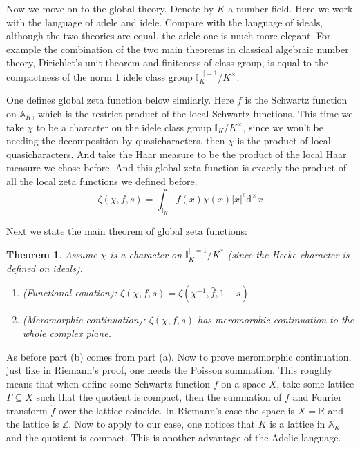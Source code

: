 \documentclass[10pt]{article}
\theoremstyle{plain}
\newtheorem{thm}{Theorem}
\theoremstyle{remark}
\begin{document}
	Now we move on to the global theory. Denote by $K$ a number field. Here we work with the language of adele and idele. Compare with the language of ideals, although the two theories are equal, the adele one is much more elegant. For example the combination of the two main theorems in classical algebraic number theory, Dirichlet's unit theorem and finiteness of class group, is equal to the compactness of the norm 1 idele class group $\mathbb{I}_K^{|\cdot|=1}/K^{\times}$.
	
	One defines global zeta function below similarly. Here $f$ is the Schwartz function on $\mathbb{A}_K$, which is the restrict product of the local Schwartz functions. This time we take $\chi$ to be a character on the idele class group $\mathbb{I}_K/K^{\times}$, since we won't be needing the decomposition by quasicharacters, then $\chi$ is the product of local quasicharacters. And take the Haar measure to be the product of the local Haar measure we chose before. And this global zeta function is exactly the product of all the local zeta functions we defined before.
	$$\zeta(\chi,f,s)=\int_{\mathbb{I}_K}f(x)\chi(x)|x|^s\mathrm{d}^{\times}x$$
	
	Next we state the main theorem of global zeta functions:
	\begin{thm}
		Assume $\chi$ is a character on $\mathbb{I}_K^{|\cdot|=1}/K^*$ (since the Hecke character is defined on ideals).
		\begin{enumerate}
			\item[(a)] (Functional equation): $\zeta(\chi,f,s)=\zeta(\chi^{-1},\widehat{f},1-s)$
			\item[(b)] (Meromorphic continuation): $\zeta(\chi,f,s)$ has meromorphic continuation to the whole complex plane.
		\end{enumerate}
	\end{thm}
	
	As before part (b) comes from part (a). Now to prove meromorphic continuation, just like in Riemann's proof, one needs the Poisson summation. This roughly means that when define some Schwartz function $f$ on a space $X$, take some lattice $\Gamma\subseteq X$ such that the quotient is compact, then the summation of $f$ and Fourier transform $\widehat{f}$ over the lattice coincide. In Riemann's case the space is $X=\mathbb{R}$ and the lattice is $\mathbb{Z}$. Now to apply to our case, one notices that $K$ is a lattice in $\mathbb{A}_K$ and the quotient is compact. This is another advantage of the Adelic language.\\
	
\end{document}
